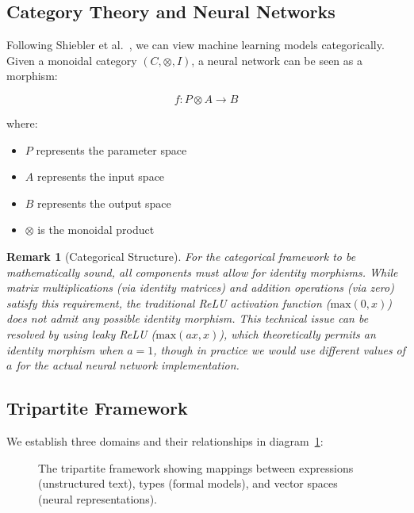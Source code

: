 \documentclass[11pt]{article}
\newtheorem{remark}{Remark}
\begin{document}
%


\subsection{Category Theory and Neural Networks}
Following Shiebler et al.~\cite{shiebler2021category}, we can view machine learning models categorically. Given a monoidal category $(C,\otimes,I)$, a neural network can be seen as a morphism:

\[
f : P \otimes A \rightarrow B
\]

where:
\begin{itemize}
    \item $P$ represents the parameter space
    \item $A$ represents the input space
    \item $B$ represents the output space
    \item $\otimes$ is the monoidal product
\end{itemize}

\begin{remark}[Categorical Structure]
For the categorical framework to be mathematically sound, all components must allow for identity morphisms. While matrix multiplications (via identity matrices) and addition operations (via zero) satisfy this requirement, the traditional ReLU activation function ($\text{max}(0,x)$) does not admit any possible identity morphism. This technical issue can be resolved by using leaky ReLU ($\text{max}(ax,x)$), which theoretically permits an identity morphism when $a=1$, though in practice we would use different values of $a$ for the actual neural network implementation.
\end{remark}

\subsection{Tripartite Framework}
We establish three domains and their relationships in diagram~\ref{fig:tripartite}:


\begin{figure}[h]
\centering
{}
\caption{The tripartite framework showing mappings between expressions (unstructured text), types (formal models), and vector spaces (neural representations).}
\label{fig:tripartite}
\end{figure}
\end{document}

